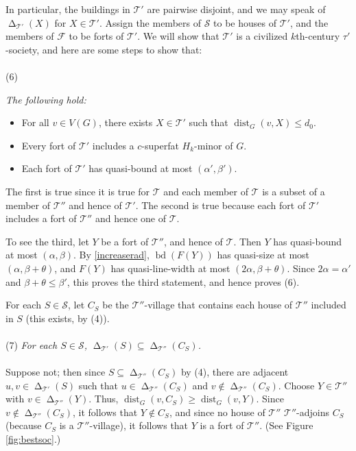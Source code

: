 \documentclass[titlepage,11pt]{article}
\newcommand{\dist}{\operatorname{dist}}
\newcommand{\voro}{\operatorname{\Delta}}
\newcommand{\bd}{\operatorname{bd}}
\newcommand{\mac}{\mathcal}
\begin{document}
	In particular, the buildings in $\mac T'$ are pairwise disjoint, and we may speak of $\voro_{\mac T'}(X)$ for $X\in \mac T'$. 
	Assign the members of $\mac S$ to be houses of $\mac T'$, and the members of $\mac F$ to be forts of $\mac T'$.
	We will show that $\mac T'$ is a civilized
	$k$th-century $\tau'$-society, and here are some steps to show that:
	\\
	\\
	(6) {\em The following hold:
		\begin{itemize}
			\item For all $v\in V(G)$, there exists $X\in \mathcal{T}'$ such that $\dist_G(v,X)\le d_0$.
			\item Every fort of $\mac T'$ includes a $c$-superfat $H_k$-minor of $G$.
			\item Each fort of $\mac T'$ has quasi-bound at most $(\alpha', \beta')$.
		\end{itemize}
	}
	\noindent
	The first is true since it is true for $\mac T$ and each member of $\mac T$ is a subset of a member of $\mac T''$ and hence of $\mac T'$. The second is true
	because each fort of $\mac T'$ includes a fort of $\mac T''$ and hence one of $\mac T$.
	
	To see the third, let $Y$ be a fort of $\mac T''$, and hence of $\mac T$. Then $Y$ has quasi-bound at most $(\alpha,\beta)$. By \ref{increaserad},
	$\bd(F(Y))$ has quasi-size at most $(\alpha, \beta+\theta)$, and $F(Y)$
	has quasi-line-width at most $(2\alpha,\beta+\theta)$. 
	Since $2\alpha= \alpha'$ and $ \beta+\theta\le \beta'$, this proves the third statement, and hence proves (6).
	
	\bigskip
	
	For each $S\in \mac S$, let $C_S$ be the $\mac T''$-village that contains each house of $\mac T''$ included in $S$ (this exists, by (4)).
	\\
	\\
	(7) {\em For each $S\in \mac S$, $\voro_{\mac T'}(S)\subseteq \voro_{\mac T''}(C_S)$.}
	\\
	\\
	Suppose not; then since $S\subseteq \voro_{\mac T''}(C_S)$ by (4), there are adjacent $u,v\in \voro_{\mac T'}(S)$ such that 
	$u\in \voro_{\mac T''}(C_S)$ and $v\notin \voro_{\mac T''}(C_S)$. Choose $Y\in \mac T''$ with $v\in \voro_{\mac T''}(Y)$. Thus, 
	$\dist_G(v,C_S)\ge \dist_G(v,Y)$. 
	Since $v\notin \voro_{\mac T''}(C_S)$, it follows that $Y\notin C_S$, and since no house of $\mac T''$ $\mac T''$-adjoins $C_S$ (because $C_S$
	is a $\mac T''$-village), it follows
	that $Y$ is a fort of $\mac T''$. (See Figure \ref{fig:bestsoc}.)
	
\end{document}
